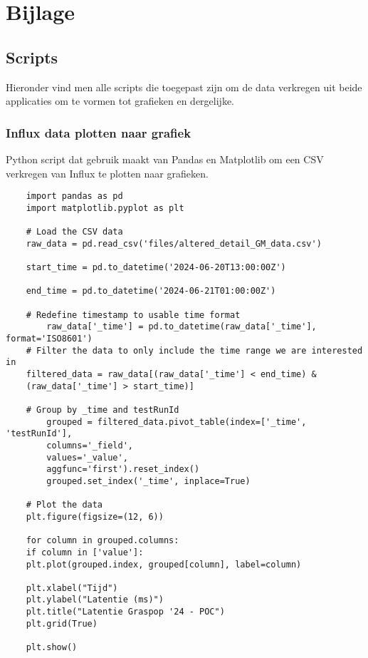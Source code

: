 \chapter{Bijlage}

\section{Scripts}

Hieronder vind men alle scripts die toegepast zijn om de data verkregen uit beide applicaties om te vormen tot grafieken en dergelijke.

\subsection{Influx data plotten naar grafiek}

Python script dat gebruik maakt van Pandas en Matplotlib om een CSV verkregen van Influx te plotten naar grafieken. 

\begin{verbatim}
    import pandas as pd
    import matplotlib.pyplot as plt
    
    # Load the CSV data
    raw_data = pd.read_csv('files/altered_detail_GM_data.csv')
    
    start_time = pd.to_datetime('2024-06-20T13:00:00Z')
    
    end_time = pd.to_datetime('2024-06-21T01:00:00Z')
    
    # Redefine timestamp to usable time format
        raw_data['_time'] = pd.to_datetime(raw_data['_time'], format='ISO8601')
    # Filter the data to only include the time range we are interested in
    filtered_data = raw_data[(raw_data['_time'] < end_time) & 
    (raw_data['_time'] > start_time)]
    
    # Group by _time and testRunId
        grouped = filtered_data.pivot_table(index=['_time', 'testRunId'],
        columns='_field',
        values='_value',
        aggfunc='first').reset_index()
        grouped.set_index('_time', inplace=True)
    
    # Plot the data
    plt.figure(figsize=(12, 6))
    
    for column in grouped.columns:
    if column in ['value']:
    plt.plot(grouped.index, grouped[column], label=column)
    
    plt.xlabel("Tijd")
    plt.ylabel("Latentie (ms)")
    plt.title("Latentie Graspop '24 - POC")
    plt.grid(True)
    
    plt.show()
\end{verbatim}